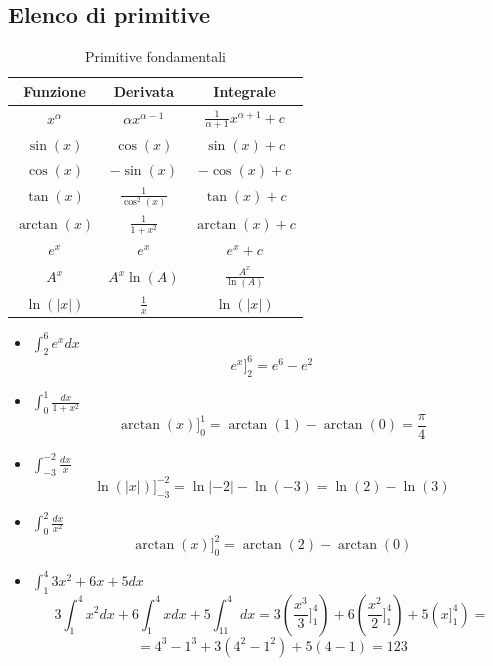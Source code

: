 \subsection*{Elenco di primitive}
\begin{table}[H]
    \centering
    \begin{tabular}{|c|c|c|}
         \hline Funzione & Derivata & Integrale\\\hline\hline
         $x^\alpha$ & $\alpha x^{\alpha-1}$ & $\frac{1}{\alpha+1}x^{\alpha +1}+c$\\\hline
         $\sin(x)$ & $\cos(x)$ & $\sin(x)+c$\\\hline
         $\cos(x)$ & $-\sin(x)$ & $-\cos(x)+c$\\\hline
         $\tan(x)$ & $\frac{1}{\cos^2(x)}$ & $\tan(x)+c$\\\hline
         $\arctan(x)$ & $\frac{1}{1+x^2}$ & $\arctan(x)+c$\\\hline
         $e^x$ & $e^x$ & $e^x+c$\\\hline
         $A^x$ & $A^x\ln(A)$ & $\frac{A^x}{\ln(A)}$\\\hline
         $\ln(|x|)$ & $\frac{1}{x}$ & $\ln(|x|)$\\\hline
    \end{tabular}
    \caption{Primitive fondamentali}
    \label{tab:primitiveFondamentali}
\end{table}

\begin{example}\phantom{}
\begin{itemize}
    \item $\int^6_2 e^xdx$\begin{equation*}e^x]^6_2=e^6-e^2\end{equation*}
    \item $\int^1_0\frac{dx}{1+x^2}$\begin{equation*}\arctan(x)]^1_0=\arctan(1)-\arctan(0)=\frac{\pi}{4}\end{equation*}
    \item $\int^{-2}_{-3}\frac{dx}{x}$\begin{equation*}\ln(|x|)]^{-2}_{-3}=\ln|-2|-\ln(-3)=\ln(2)-\ln(3)\end{equation*}
    \item $\int^2_0\frac{dx}{x^2}$\begin{equation*}\arctan(x)]^2_0=\arctan(2)-\arctan(0)\end{equation*}
    \item $\int^4_1 3x^2+6x+5 dx$\begin{equation*}3\int^4_1x^2dx+6\int^4_1xdx+5\int^4_11dx=3(\frac{x^3}{3}]^4_1)+6(\frac{x^2}{2}]^4_1)+5(x]^4_1)=\end{equation*}\begin{equation*}
        =4^3-1^3+3(4^2-1^2)+5(4-1)=123\end{equation*}
\end{itemize}
\end{example}



